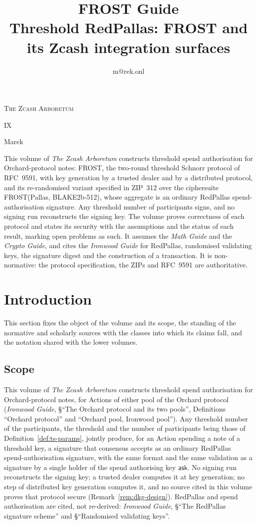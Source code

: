 \documentclass[11pt,a4paper]{article}
\title{\textbf{\Huge FROST Guide}\\[6pt]\large Threshold RedPallas: FROST and its Zcash integration surfaces}
\author{m@rek.onl}
\date{}
\makeatletter
\theoremstyle{definition}
\let\arb@tableofcontents\tableofcontents
\renewcommand{\tableofcontents}{{\hypersetup{pdfborderstyle={/S/U/W 0}}%
  \arb@tableofcontents}}
\providecommand{\accession}{}
\def\arb@name#1#2\@nil{\def\arbvolname{#2}}
\def\arb@parsetitle\textbf#1\\[#2]#3#4\@nil{\arb@name#1\@nil\def\arb@sub{#4}}
\providecommand{\arbvolname}{}
\renewcommand{\maketitle}{\expandafter\arb@parsetitle\@title\@nil
  \hypersetup{pdftitle={\arbvolname: \arb@sub},pdfauthor={Marek}}%
  \thispagestyle{empty}\begingroup\raggedright
  {\fontsize{13.2}{16}\selectfont\scshape The Zcash Arboretum\par}
  \vspace*{50mm}
  {\fontsize{47.3}{50}\selectfont\accession\par}
  \vspace{6mm}
  {\fontsize{22.8}{27}\selectfont\arbvolname\par}
  \vspace{3mm}
  {\fontsize{13.2}{17}\selectfont\arb@sub\par}
  \vspace{18mm}
  {\fontsize{13.2}{17}\selectfont Marek\par}
  {\small\@author\par}
  \endgroup\clearpage}
\newcommand{\ask}{\ensuremath{\mathsf{ask}}}
\renewenvironment{abstract}{%
  \small\begin{center}{\bfseries\abstractname}\end{center}\medskip\noindent\ignorespaces
}{\par\medskip}
\renewcommand{\accession}{IX}
\makeatother
\begin{document}
\maketitle

\begin{abstract}
This volume of \emph{The Zcash Arboretum} constructs threshold spend
authorisation for Orchard-protocol notes: FROST, the two-round threshold
Schnorr protocol of RFC~9591, with key generation by a trusted dealer and by a
distributed protocol, and its re-randomised variant specified in ZIP~312 over
the ciphersuite FROST(Pallas, BLAKE2b-512), whose aggregate is an ordinary
RedPallas spend-authorisation signature. Any threshold number of participants
signs, and no signing run reconstructs the signing key. The volume proves
correctness of each protocol and states its security with the assumptions and
the status of each result, marking open problems as such. It assumes the
\emph{Math Guide} and the \emph{Crypto Guide}, and cites the \emph{Ironwood
Guide} for RedPallas, randomised validating keys, the signature digest and the
construction of a transaction. It is non-normative: the protocol
specification, the ZIPs and RFC~9591 are authoritative.
\end{abstract}
\clearpage
\tableofcontents
\clearpage

\section{Introduction}\label{sec:intro}

This section fixes the object of the volume and its scope, the standing of
the normative and scholarly sources with the classes into which its claims
fall, and the notation shared with the lower volumes.

\subsection{Scope}\label{sec:intro-scope}

This volume of \emph{The Zcash Arboretum} constructs threshold spend
authorisation for Orchard-protocol notes, for Actions of either pool of the
Orchard protocol (\emph{Ironwood Guide}, \S``The Orchard protocol and its two
pools'', Definitions ``Orchard protocol'' and ``Orchard pool, Ironwood
pool''). Any threshold number of the participants, the threshold and the
number of participants being those of Definition~\ref{def:ts-params},
jointly produce, for an Action spending a note of a threshold key, a
signature that consensus accepts as an ordinary RedPallas
spend-authorisation signature, with the same format and the same validation
as a signature by a single holder of the spend authorising key
\(\ask\). No signing run reconstructs the signing key; a trusted dealer computes
it at key generation; no step of distributed key generation computes it,
and no source cited in this volume proves that protocol secure
(Remark~\ref{rem:dkg-design}). RedPallas
and spend authorisation are cited, not re-derived: \emph{Ironwood Guide},
\S``The RedPallas signature scheme'' and \S``Randomised validating keys''.
\end{document}
